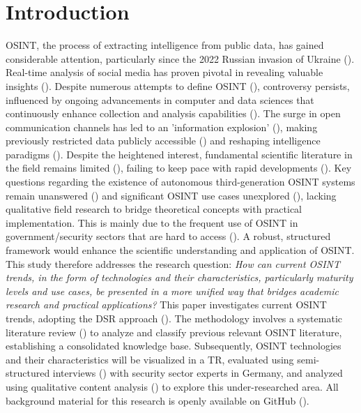 \documentclass[10pt]{article}
\begin{document}
\section{Introduction} \label{sec:introduction}

OSINT, the process of extracting intelligence from public data, has gained considerable attention, particularly since
the 2022 Russian invasion of Ukraine (\cite{DosPassos.2017}). Real-time analysis of social media has proven pivotal in revealing
valuable insights (\cite{SmithBoyle.24.07.2023}). Despite numerous attempts to define OSINT
(\cite{PastorGalindo.2020, Yogish.2021}), controversy persists, influenced by ongoing advancements in computer and
data sciences that continuously enhance collection and analysis capabilities (\cite{Ghioni.2023}).
The surge in open communication channels has led to an 'information explosion' (\cite{Hwang.2022}),
making previously restricted data publicly accessible (\cite{Williams.2018}) and reshaping intelligence paradigms (\cite{Dokman.2020}).
Despite the heightened interest, fundamental scientific literature in the field remains limited (\cite{HerreraCubides.2020}),
failing to keep pace with rapid developments (\cite{Ghioni.2023, Williams.2018}). Key questions regarding the existence of
autonomous third-generation OSINT systems remain unanswered
(\cite{Ghioni.2023, PastorGalindo.2020, Yogish.2021}) and significant OSINT use cases unexplored
(\cite{AlKilani.2021, Ghioni.2023}), lacking qualitative field research to bridge theoretical concepts with
practical implementation. This is mainly due to the frequent use of OSINT in government/security sectors that are hard to access (\cite{HerreraCubides.2020, PastorGalindo.2019}). A robust, structured framework would enhance the scientific understanding and application of OSINT. This study therefore addresses the research question:
\textit{How can current OSINT trends, in the form of technologies and their characteristics, particularly maturity levels and use cases, be presented in a more unified way that bridges academic research and practical applications?}
This paper investigates current OSINT trends, adopting the DSR approach (\cite{Peffers.2007}).
The methodology involves a systematic literature review (\cite{Cleven.2009}) to analyze and classify previous relevant OSINT literature, establishing a consolidated knowledge base.
Subsequently, OSINT technologies and their characteristics will be visualized in a TR, evaluated using semi-structured
interviews (\cite{Glaser.2009}) with security sector experts in Germany, and analyzed using qualitative content analysis (\cite{Billings.1997}) to explore this under-researched area. All background material for this research is openly available on GitHub (\cite{kayser2024}).
\end{document}
